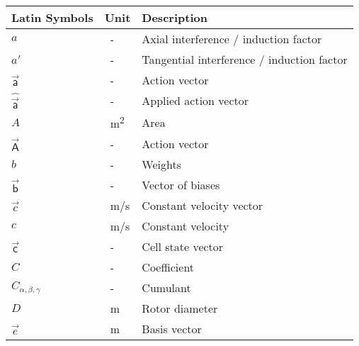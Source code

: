 \begin{longtable}{p{5cm}p{4cm}p{5cm}}
	Latin Symbols 			& Unit      	& Description      \\ \hline
	$a$						& \SI{}{-}		& Axial interference / induction factor \\
	$a'$					& \SI{}{-}		& Tangential interference / induction factor \\
	$\vec{\mathsf{a}}$		& \SI{}{-}		& Action vector \\
	$\hat{\vec{\mathsf{a}}}$& \SI{}{-}		& Applied action vector \\
	$A$						& \SI{}{m^2}	& Area \\
	$\vec{\mathsf{A}}$		& \SI{}{-}		& Action vector \\
	$b$						& \SI{}{-}		& Weights \\
	$\vec{\mathsf{b}}$		& \SI{}{-}		& Vector of biases \\
    $\vec{c}$               & \SI{}{m/s}    & Constant velocity vector \\
    $c$                     & \SI{}{m/s}    & Constant velocity \\
   	$\vec{\mathsf{c}}$		& \SI{}{-}		& Cell state vector \\
    $C$						& \SI{}{-}		& Coefficient \\
    $C_{\alpha, \beta, \gamma}$& \SI{}{-}	& Cumulant \\
    $D$						& \SI{}{m}		& Rotor diameter \\
    $\vec{e}$				& \SI{}{m}		& Basis vector \\

\end{longtable}
